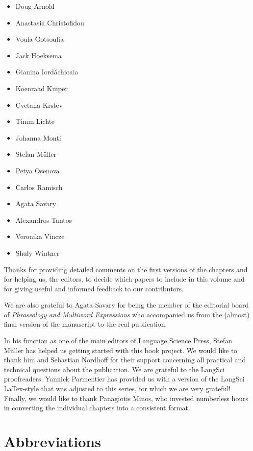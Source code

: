 \documentclass[output=paper]{langsci/langscibook}
\begin{document}
\begin{itemize}
\item Doug Arnold
\item Anastasia Christofidou
\item Voula Gotsoulia
\item Jack Hoeksema
\item Gianina Iord\v{a}chioaia
\item Koenraad Kuiper
\item Cvetana Krstev
\item Timm Lichte
\item Johanna Monti
\item Stefan Müller
\item Petya Osenova
\item Carlos Ramisch
\item Agata Savary
\item Alexandros Tantos
\item Veronika Vincze
\item Shuly Wintner
\end{itemize} 
Thanks for providing detailed comments on the first versions of the chapters and for helping us, the editors, to decide which papers to include in this volume and for giving useful and informed feedback to our contributors.

We are also grateful to  Agata Savary for being the member of the editorial board of \emph{Phraseology and Multiword Expressions} who accompanied us from the (almost) final version of the manuscript to the real publication.

In his function as one of the main editors of Language Science Press,  Stefan M\"uller has helped us getting started with this book project. We would like to thank him and Sebastian Nordhoff for their support concerning all practical and technical questions about the publication. We are grateful to the LangSci proofreaders.
 Yannick Parmentier has provided us with a version of the LangSci LaTex-style that was adjusted to this series, for which we are very grateful! Finally, we would like to thank  Panagiotis Minos, who invested numberless hours in converting the individual chapters into a consistent format. 

\section*{Abbreviations} 
\end{document}
